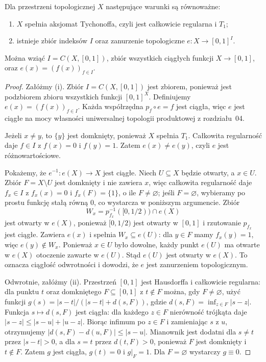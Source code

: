 \begin{twierdzenie}
\label{thm:topog-zwartosc-zanurzenie-kostka}
Dla przestrzeni topologicznej $X$ następujące
warunki są równoważne:
\begin{enumerate}[label=(\roman*)]
\item $X$ spełnia aksjomat Tychonoffa, czyli jest
całkowicie regularna i $T_1$;
\item istnieje zbiór indeksów $I$ oraz zanurzenie
topologiczne $e\colon X\to[0,1]^I$.
\end{enumerate}
Można wziąć $I=C(X,[0,1])$, zbiór wszystkich
ciągłych funkcji $X\to[0,1]$, oraz
$e(x)=(f(x))_{f\in I}$.
\end{twierdzenie}
\begin{proof}
Załóżmy (i). Zbiór $I=C(X,[0,1])$ jest zbiorem,
ponieważ jest podzbiorem zbioru wszystkich funkcji
$[0,1]^X$. Definiujemy
$e(x)=(f(x))_{f\in I}$.
Każda współrzędna $p_f\circ e=f$ jest ciągła,
więc $e$ jest ciągłe na mocy własności uniwersalnej
topologii produktowej z rozdziału~04.

Jeżeli $x\ne y$, to $\{y\}$ jest domknięty,
ponieważ $X$ spełnia $T_1$. Całkowita regularność
daje $f\in I$ z $f(x)=0$ i $f(y)=1$.
Zatem $e(x)\ne e(y)$, czyli $e$ jest różnowartościowe.

Pokażemy, że $e^{-1}\colon e(X)\to X$ jest ciągłe.
Niech $U\subseteq X$ będzie otwarty, a $x\in U$.
Zbiór $F=X\setminus U$ jest domknięty i nie zawiera
$x$, więc całkowita regularność daje $f_x\in I$
z $f_x(x)=0$ i $f_x(F)=\{1\}$, o ile $F\ne\varnothing$;
jeśli $F=\varnothing$, wybieramy po prostu funkcję
stałą równą $0$, co wystarcza w poniższym argumencie.
Zbiór
\[
W_x=p_{f_x}^{-1}([0,1/2))\cap e(X)
\]
jest otwarty w $e(X)$, ponieważ $[0,1/2)$ jest otwarty
w $[0,1]$ i rzutowanie $p_{f_x}$ jest ciągłe.
Zawiera $e(x)$ i spełnia $W_x\subseteq e(U)$:
dla $y\in F$ mamy
$f_x(y)=1$, więc $e(y)\notin W_x$.
Ponieważ $x\in U$ było dowolne, każdy punkt
$e(U)$ ma otwarte w $e(X)$ otoczenie zawarte
w $e(U)$. Stąd $e(U)$ jest otwarty w $e(X)$.
To oznacza ciągłość odwrotności i dowodzi,
że $e$ jest zanurzeniem topologicznym.

Odwrotnie, załóżmy (ii). Przestrzeń $[0,1]$ jest
Hausdorffa i całkowicie regularna: dla punktu
$t$ oraz domkniętego $F\subseteq[0,1]$ z $t\notin F$
można, gdy $F\ne\varnothing$, użyć funkcji
$g(s)=|s-t|/(|s-t|+d(s,F))$, gdzie
$d(s,F)=\inf_{z\in F}|s-z|$.
Funkcja $s\mapsto d(s,F)$ jest ciągła:
dla każdego $z\in F$ nierówność trójkąta daje
$|s-z|\le |s-u|+|u-z|$. Biorąc infimum po
$z\in F$ i zamieniając $s$ z $u$, otrzymujemy
$|d(s,F)-d(u,F)|\le |s-u|$.
Mianownik jest dodatni dla $s\ne t$ przez
$|s-t|>0$, a dla $s=t$ przez $d(t,F)>0$,
ponieważ $F$ jest domknięty i $t\notin F$.
Zatem $g$ jest ciągła, $g(t)=0$ i $g|_F=1$.
Dla $F=\varnothing$ wystarczy $g\equiv0$.


\end{proof}
